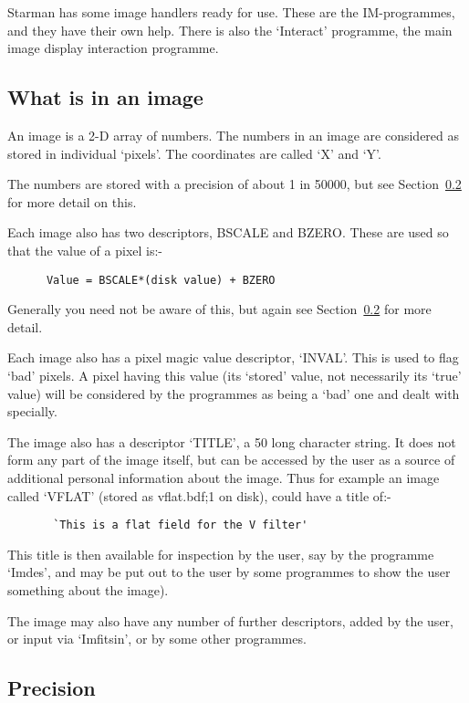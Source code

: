 Starman has some image handlers ready for use. These are the 
IM-programmes, and they have their own help. There is also the
`Interact' programme, the main image display interaction programme.

\subsection{What is in an image}

An image is a 2-D array of numbers. The numbers in an image are 
considered as stored in individual `pixels'. The coordinates are 
called `X' and `Y'.

The numbers are stored with a precision of about 1 in 50000,
but see Section~\ref{se:im_prec} for more detail on this.

Each image also has two descriptors, BSCALE and BZERO. These
are used so that the value of a pixel is:-

\begin{verbatim}
      Value = BSCALE*(disk value) + BZERO
\end{verbatim}

Generally you need not be aware of this, but again see 
Section~\ref{se:im_prec} for more detail.

Each image also has a pixel magic value descriptor, `INVAL'.
This is used to flag `bad' pixels. A pixel having this
value (its `stored' value, not necessarily its `true' value)
will be considered by the programmes as being a `bad' one
and dealt with specially.

The image also has a descriptor `TITLE', a 50 long character 
string. It does not form any part of the image itself, but can 
be accessed by the user as a source of additional personal 
information about the image. Thus for example an image called 
`VFLAT' (stored as vflat.bdf;1 on disk), could have a title of:-
\begin{verbatim}
       `This is a flat field for the V filter'
\end{verbatim}

This title is then available for inspection by the user, say by 
the programme `Imdes', and may be put out to the user by some 
programmes to show the user something about the image).

The image may also have any number of further descriptors,
added by the user, or input via `Imfitsin', or by some other
programmes.

\subsection{Precision}
\label{se:im_prec}

